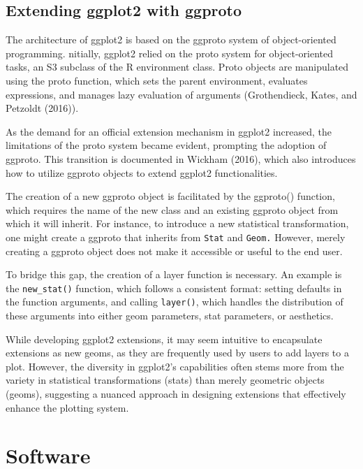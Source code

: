\hypertarget{extending-ggplot2-with-ggproto}{%
\subsection{Extending ggplot2 with ggproto}\label{extending-ggplot2-with-ggproto}}

The architecture of ggplot2 is based on the ggproto system of object-oriented programming. nitially, ggplot2 relied on the proto system for object-oriented tasks, an S3 subclass of the R environment class. Proto objects are manipulated using the proto function, which sets the parent environment, evaluates expressions, and manages lazy evaluation of arguments (Grothendieck, Kates, and Petzoldt (2016)).

As the demand for an official extension mechanism in ggplot2 increased, the limitations of the proto system became evident, prompting the adoption of ggproto. This transition is documented in Wickham (2016), which also introduces how to utilize ggproto objects to extend ggplot2 functionalities.

The creation of a new ggproto object is facilitated by the ggproto() function, which requires the name of the new class and an existing ggproto object from which it will inherit. For instance, to introduce a new statistical transformation, one might create a ggproto that inherits from \texttt{Stat} and \texttt{Geom.} However, merely creating a ggproto object does not make it accessible or useful to the end user.

To bridge this gap, the creation of a layer function is necessary. An example is the \texttt{new\_stat()} function, which follows a consistent format: setting defaults in the function arguments, and calling \texttt{layer()}, which handles the distribution of these arguments into either geom parameters, stat parameters, or aesthetics.

While developing ggplot2 extensions, it may seem intuitive to encapsulate extensions as new geoms, as they are frequently used by users to add layers to a plot. However, the diversity in ggplot2's capabilities often stems more from the variety in statistical transformations (stats) than merely geometric objects (geoms), suggesting a nuanced approach in designing extensions that effectively enhance the plotting system.

\hypertarget{software}{%
\section{Software}\label{software}}

